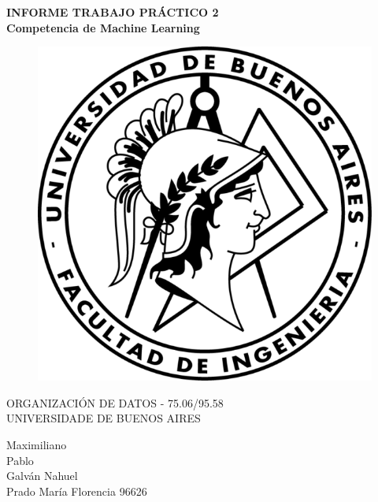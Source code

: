 \documentclass{tcc}
\begin{document}
\pagestyle{empty} %


\begin{center}
\LARGE{\bf INFORME TRABAJO PRÁCTICO 2}\\
\Large{\bf Competencia de Machine Learning}\\
\end{center}



\begin{figure}[H]
\centering
\includegraphics{imagenes/fiuba.png}
\end{figure}

\begin{center}
ORGANIZACIÓN DE DATOS - 75.06/95.58 \\
UNIVERSIDADE DE BUENOS AIRES

\end{center}

\vspace{1in}

\vspace{3em}

\begin{center}
Maximiliano \\
Pablo\\
Galván Nahuel \\
Prado María Florencia 96626
\end{center}
\end{document}
